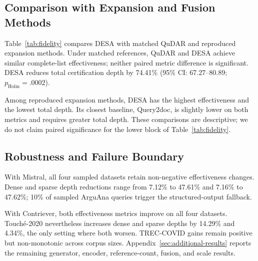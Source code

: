 \subsection{Comparison with Expansion and Fusion Methods}

\label{comparison-with-expansion-and-fusion-methods}

Table~\ref{tab:fidelity} compares DESA with matched QuDAR and reproduced expansion methods. Under matched references, QuDAR and DESA achieve similar complete-list effectiveness; neither paired metric difference is significant. DESA reduces total certification depth by 74.41\% (95\% CI: 67.27--80.89; \(p_{\mathrm{Holm}}=.0002\)).



Among reproduced expansion methods, DESA has the highest effectiveness and the lowest total depth. Its closest baseline, Query2doc, is slightly lower on both metrics and requires greater total depth. These comparisons are descriptive; we do not claim paired significance for the lower block of Table~\ref{tab:fidelity}.

\subsection{Robustness and Failure Boundary}

\label{robustness-and-failure-boundary}

With Mistral, all four sampled datasets retain non-negative effectiveness changes. Dense and sparse depth reductions range from 7.12\% to 47.61\% and 7.16\% to 47.62\%; 10\% of sampled ArguAna queries trigger the structured-output fallback.

With Contriever, both effectiveness metrics improve on all four datasets. Touché-2020 nevertheless increases dense and sparse depths by 14.29\% and 4.34\%, the only setting where both worsen. TREC-COVID gains remain positive but non-monotonic across corpus sizes. Appendix~\ref{sec:additional-results} reports the remaining generator, encoder, reference-count, fusion, and scale results.

\FloatBarrier
